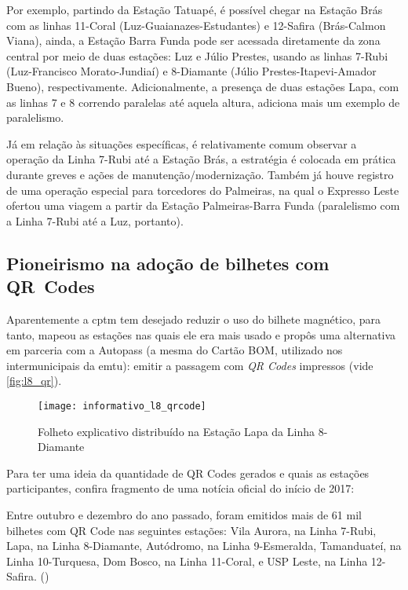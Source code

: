 \documentclass[11pt,fleqn]{book} %
\begin{document}
Por exemplo, partindo da Estação Tatuapé, é possível chegar na Estação Brás com as linhas 11-Coral (Luz-Guaianazes-Estudantes) e 12-Safira (Brás-Calmon Viana), ainda, a Estação Barra Funda pode ser acessada diretamente da zona central por meio de duas estações: Luz e Júlio Prestes, usando as linhas 7-Rubi (Luz-Francisco Morato-Jundiaí) e 8-Diamante (Júlio Prestes-Itapevi-Amador Bueno), respectivamente. Adicionalmente, a presença de duas estações Lapa, com as linhas 7 e 8 correndo paralelas até aquela altura, adiciona mais um exemplo de paralelismo.

Já em relação às situações específicas, é relativamente comum observar a operação da Linha 7-Rubi até a Estação Brás, a estratégia é colocada em prática durante greves e ações de manutenção/modernização. Também já houve registro de uma operação especial para torcedores do Palmeiras, na qual o Expresso Leste ofertou uma viagem a partir da Estação Palmeiras-Barra Funda (paralelismo com a Linha 7-Rubi até a Luz, portanto).

\subsection{Pioneirismo na adoção de bilhetes com QR Codes}

Aparentemente a \gls{cptm} tem desejado reduzir o uso do bilhete magnético, para tanto, mapeou as estações nas quais ele era mais usado e propôs uma alternativa em parceria com a Autopass (a mesma do Cartão BOM, utilizado nos intermunicipais da \gls{emtu}): emitir a passagem com \textit{QR Codes} impressos (vide \autoref{fig:l8_qr}).

\begin{figure}[b!]
	\centering
	\caption[Informativo QR Codes]{Folheto explicativo distribuído na Estação Lapa da Linha 8-Diamante}
	\texttt{[image: informativo\_l8\_qrcode]}
	\label{fig:l8_qr}
\end{figure}

Para ter uma ideia da quantidade de QR Codes gerados e quais as estações participantes, confira fragmento de uma notícia oficial do início de 2017:

\begin{citacao}
	Entre outubro e dezembro do ano passado, foram emitidos mais de 61 mil bilhetes com QR Code nas seguintes estações: Vila Aurora, na Linha 7-Rubi, Lapa, na Linha 8-Diamante, Autódromo, na Linha 9-Esmeralda, Tamanduateí, na Linha 10-Turquesa, Dom Bosco, na Linha 11-Coral, e USP Leste, na Linha 12-Safira. (\cite{sitecptm_vendaqr})
\end{citacao}
\end{document}
